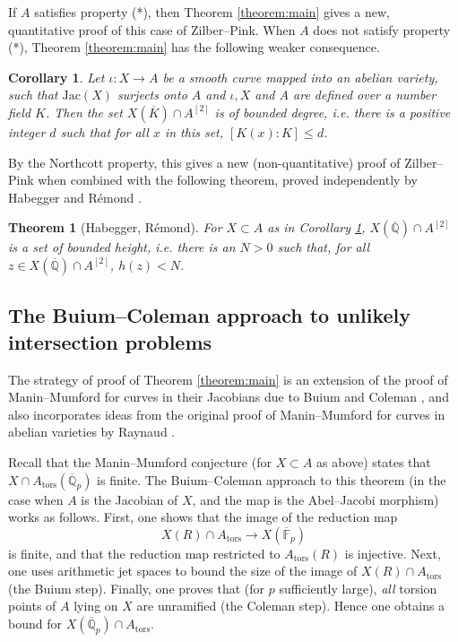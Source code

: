 \documentclass[11pt]{amsart}
\def\Q{\mathbb Q}
\newcommand{\tors}{\mathrm{tors}}
\theoremstyle{plain}
\newtheorem{theorem}{Theorem}
\newtheorem{corollary}{Corollary}
\theoremstyle{definition}
\newcommand{\F}{\mathbb{F}}
\newcommand{\Jac}{\mathrm{Jac}}
\begin{document}
If $A$ satisfies property (*), then Theorem \ref{theorem:main} gives a new, quantitative proof of this case of Zilber--Pink. When $A$ does not satisfy property (*), Theorem \ref{theorem:main} has the following weaker consequence.
\begin{corollary}\label{cor:deg}
Let $\iota :X\to A$ be a smooth curve mapped into an abelian variety, such that $\Jac (X)$ surjects onto $A$ and $\iota ,X$ and $A$ are defined over a number field $K$. Then the set $X(\overline{K})\cap A^{[2]}$ is of bounded degree, i.e. there is a positive integer $d$ such that for all $x$ in this set, $[K(x):K]\leq d$.
\end{corollary}
By the Northcott property, this gives a new (non-quantitative) proof of Zilber--Pink when combined with the following theorem, proved independently by Habegger and R\'emond \cite{Hab} \cite{rem1}.
\begin{theorem}[Habegger, R\'emond]
For $X\subset A$ as in Corollary \ref{cor:deg}, $X(\overline{\Q })\cap A^{[2]}$ is a set of bounded height, i.e. there is an $N>0$ such that, for all $z\in X(\overline{\Q })\cap A^{[2]}$, $h(z)<N$.
\end{theorem}

\subsection{The Buium--Coleman approach to unlikely intersection problems}
The strategy of proof of Theorem \ref{theorem:main} is an extension of the proof of Manin--Mumford for curves in their Jacobians due to Buium and Coleman \cite{buium:96} \cite{coleman:ramified}, and also incorporates ideas from the original proof of Manin--Mumford for curves in abelian varieties by Raynaud \cite{raynaud}.

Recall that the Manin--Mumford conjecture (for $X\subset A$ as above) states that $X\cap A_{\tors }(\overline{\Q }_p )$ is finite. The Buium--Coleman approach to this theorem (in the case when $A$ is the Jacobian of $X$, and the map is the Abel--Jacobi morphism) works as follows. First, one shows that the image of the reduction map
\[
X(R)\cap A_{\tors }\to X(\overline{\F }_p )
\]
is finite, and that the reduction map restricted to $A_{\tors}(R)$ is injective. Next, one uses arithmetic jet spaces to bound the size of the image of $X(R)\cap A_{\tors }$ (the Buium step). Finally, one proves that (for $p$ sufficiently large), \textit{all} torsion points of $A$ lying on $X$ are unramified (the Coleman step). Hence one obtains a bound for $X(\overline{\Q }_p )\cap A_{\tors }$.
\end{document}
